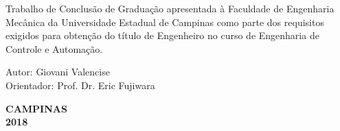 \vspace*{2cm}
\begin{flushleft}
Trabalho de Conclusão de Graduação apresentada à Faculdade de Engenharia Mecânica da Universidade Estadual de Campinas como parte dos requisitos exigidos para obtenção do título de Engenheiro no curso de Engenharia de Controle e Automação.
\end{flushleft}

\vspace*{0.5cm}



\vspace{0.5cm}
\noindent
Autor: Giovani Valencise\\
Orientador: Prof. Dr. Eric Fujiwara	\\


\vspace{0.6cm}

\vspace{4.0cm}
\begin{center}
\textbf{CAMPINAS}\\ 
\textbf{2018}
\end{center}





